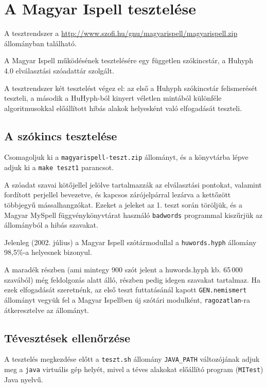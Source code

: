 \chapter{A Magyar Ispell tesztelése}

A tesztrendszer a \url{http://www.szofi.hu/gnu/magyarispell/magyarispell.zip}
állományban található.

A Magyar Ispell működésének tesztelésére egy független szókincstár,
a Huhyph 4.0 elválasztási szóadattár szolgált.

A tesztrendszer két tesztelést végez el: az első
a Huhyph szókincstár felismerését teszteli,
a második a HuHyph-ból kinyert véletlen mintából
különféle algoritmusokkal előállított hibás
alakok helyesként való elfogadását teszteli.

\section{A szókincs tesztelése}

Csomagoljuk ki a \texttt{magyarispell-teszt.zip}
állományt, és a könyvtárba lépve adjuk ki
a \texttt{make teszt1} parancsot.

A szóadat szavai kötőjellel jelölve tartalmazzák az
elválasztási pontokat, valamint fordított perjellel
bevezetve, és kapcsos zárójelpárral lezárva a kettőzött
többjegyű mássalhangzókat. Ezeket a jeleket 
az 1. teszt során töröljük, és a Magyar MySpell függvénykönyvtárat
használó \texttt{badwords} programmal kiszűrjük az állományból
a hibás szavakat.

Jelenleg (2002. július) a Magyar Ispell szótármodullal a \texttt{huwords.hyph}
állomány 98,5\%-a helyesnek bizonyul.

A maradék részben (ami mintegy 900 szót jelent a huwords.hyph
kb. 65\,000 szavából) még feldolgozás alatt álló, részben
pedig idegen szavakat tartalmaz. Ha ezek elfogadását szeretnénk,
az első teszt futtatásánál kapott \texttt{GEN.nemismert}
állományt vegyük fel a Magyar Ispellben új szótári modulként,
\texttt{ragozatlan}-ra átkeresztelve az állományt.

\section{Tévesztések ellenőrzése}

A tesztelés megkezdése előtt a \texttt{teszt.sh}
állomány \texttt{JAVA\_PATH} változójának adjuk meg
a \texttt{java} virtuális gép helyét, mivel a téves
alakokat előállító program (\texttt{MITest}) Java nyelvű.

